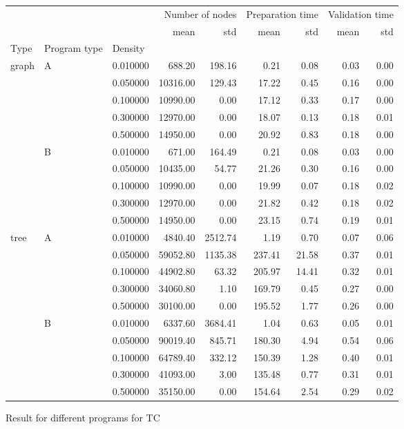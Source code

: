 \begin{figure}
    \begin{tabular}{lllrrrrrr}
        &  &  & \multicolumn{2}{r}{Number of nodes} & \multicolumn{2}{r}{Preparation time} & \multicolumn{2}{r}{Validation time} \\
        &  &  & mean & std & mean & std & mean & std \\
       Type & Program type & Density &  &  &  &  &  &  \\
       \multirow[c]{10}{*}{graph} & \multirow[c]{5}{*}{A} & 0.010000 & 688.20 & 198.16 & 0.21 & 0.08 & 0.03 & 0.00 \\
        &  & 0.050000 & 10316.00 & 129.43 & 17.22 & 0.45 & 0.16 & 0.00 \\
        &  & 0.100000 & 10990.00 & 0.00 & 17.12 & 0.33 & 0.17 & 0.00 \\
        &  & 0.300000 & 12970.00 & 0.00 & 18.07 & 0.13 & 0.18 & 0.01 \\
        &  & 0.500000 & 14950.00 & 0.00 & 20.92 & 0.83 & 0.18 & 0.00 \\
        & \multirow[c]{5}{*}{B} & 0.010000 & 671.00 & 164.49 & 0.21 & 0.08 & 0.03 & 0.00 \\
        &  & 0.050000 & 10435.00 & 54.77 & 21.26 & 0.30 & 0.16 & 0.00 \\
        &  & 0.100000 & 10990.00 & 0.00 & 19.99 & 0.07 & 0.18 & 0.02 \\
        &  & 0.300000 & 12970.00 & 0.00 & 21.82 & 0.42 & 0.18 & 0.02 \\
        &  & 0.500000 & 14950.00 & 0.00 & 23.15 & 0.74 & 0.19 & 0.01 \\
       \multirow[c]{10}{*}{tree} & \multirow[c]{5}{*}{A} & 0.010000 & 4840.40 & 2512.74 & 1.19 & 0.70 & 0.07 & 0.06 \\
        &  & 0.050000 & 59052.80 & 1135.38 & 237.41 & 21.58 & 0.37 & 0.01 \\
        &  & 0.100000 & 44902.80 & 63.32 & 205.97 & 14.41 & 0.32 & 0.01 \\
        &  & 0.300000 & 34060.80 & 1.10 & 169.79 & 0.45 & 0.27 & 0.00 \\
        &  & 0.500000 & 30100.00 & 0.00 & 195.52 & 1.77 & 0.26 & 0.00 \\
        & \multirow[c]{5}{*}{B} & 0.010000 & 6337.60 & 3684.41 & 1.04 & 0.63 & 0.05 & 0.01 \\
        &  & 0.050000 & 90019.40 & 845.71 & 180.30 & 4.94 & 0.54 & 0.06 \\
        &  & 0.100000 & 64789.40 & 332.12 & 150.39 & 1.28 & 0.40 & 0.01 \\
        &  & 0.300000 & 41093.00 & 3.00 & 135.48 & 0.77 & 0.31 & 0.01 \\
        &  & 0.500000 & 35150.00 & 0.00 & 154.64 & 2.54 & 0.29 & 0.02 \\
       \end{tabular}
    \caption{Result for different programs for TC}       
\end{figure}

